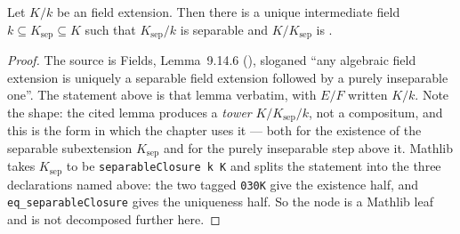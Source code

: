 \begin{lemma}
\label{lem:pc-separable-purely-inseparable-tower}
Let $K/k$ be an  field
extension.  Then there is a unique intermediate field
$k\subseteq K_{\mathrm{sep}}\subseteq K$ such that $K_{\mathrm{sep}}/k$
is separable and $K/K_{\mathrm{sep}}$ is
.
\mathlibok\ 
\end{lemma}
\begin{proof}
The source is Fields, Lemma~9.14.6 (), sloganed
``any algebraic field extension is uniquely a separable field extension
followed by a purely inseparable one''.  The statement above is that
lemma verbatim, with $E/F$ written $K/k$.  Note the shape: the cited
lemma produces a \emph{tower} $K/K_{\mathrm{sep}}/k$, not a compositum,
and this is the form in which the chapter uses it --- both for the
existence of the separable subextension $K_{\mathrm{sep}}$ and for the
purely inseparable step above it.  Mathlib takes $K_{\mathrm{sep}}$ to
be \texttt{separableClosure k K} and splits the statement into the
three declarations named above: the two tagged
\texttt{030K} give the existence half, and
\texttt{eq\_separableClosure} gives the uniqueness half.  So the node is
a Mathlib leaf and is not decomposed further here.
\end{proof}

